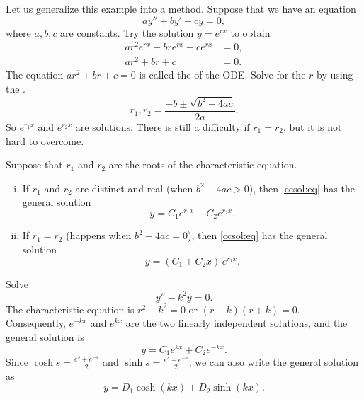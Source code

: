 \medskip

Let us generalize this example into a method.
Suppose that we have an equation
\begin{equation} \label{ccsol:eq}
a y'' + b y' + c y = 0 ,
\end{equation}
where $a, b, c$ are constants.  Try the solution $y = e^{rx}$ to obtain
\begin{align*}
a r^2 e^{rx} + 
b r e^{rx} + 
c e^{rx} & = 0 , \\
a r^2 + 
b r + 
c & = 0 .
\end{align*}
The equation $a r^2 + b r + c = 0$ is called the
\emph{} of the ODE\@.
Solve for the $r$ by using the .
\begin{equation*}
r_1, r_2 = \frac{-b \pm \sqrt{b^2 - 4ac}}{2a} .
\end{equation*}
So $e^{r_1 x}$ and $e^{r_2 x}$ are solutions.  There is
still a difficulty if $r_1 = r_2$, but it is not hard to overcome.

\begin{theorem}
Suppose that $r_1$ and $r_2$ are the roots of the characteristic equation.
\begin{enumerate}[(i)]
\item If $r_1$ and $r_2$ are distinct and real (when $b^2 - 4ac > 0$),
then \eqref{ccsol:eq} has the general solution
\begin{equation*}
y = C_1 e^{r_1 x} + C_2 e^{r_2 x} .
\end{equation*}
\item If $r_1 = r_2$ (happens when $b^2 - 4ac = 0$), 
then \eqref{ccsol:eq} has the general solution
\begin{equation*}
y = (C_1 + C_2 x)\, e^{r_1 x} .
\end{equation*}
\end{enumerate}
\end{theorem}

\begin{example} \label{example:expsecondorder}
Solve
\begin{equation*}
y'' - k^2 y = 0 .
\end{equation*}
The characteristic equation is $r^2 - k^2 = 0$ or 
$(r-k)(r+k) = 0$.  Consequently, $e^{-k x}$ and $e^{kx}$ are the two
linearly independent solutions, and the general solution is
\begin{equation*}
y = C_1 e^{kx} + C_2e^{-kx} .
\end{equation*}
Since
$\cosh s = \frac{e^s+e^{-s}}{2}$
and
$\sinh s = \frac{e^s-e^{-s}}{2}$,
we can also write the general solution
as
\begin{equation*}
y = D_1 \cosh(kx) + D_2 \sinh(kx) .
\end{equation*}
\end{example}

